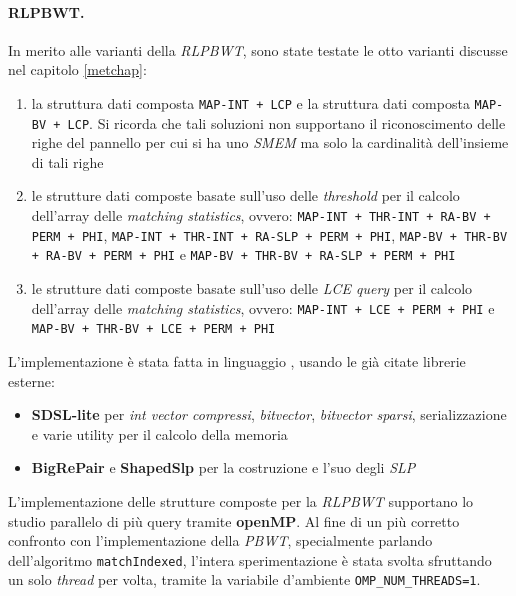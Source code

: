 \paragraph{RLPBWT.}
In merito alle varianti della \textit{RLPBWT}, sono state testate le otto
varianti discusse nel capitolo \ref{metchap}:
\begin{enumerate}
  \item la struttura dati composta \texttt{MAP-INT + LCP} e la struttura dati
  composta \texttt{MAP-BV + LCP}. Si ricorda che tali soluzioni non supportano
  il riconoscimento delle righe del pannello per cui si ha uno \textit{SMEM} ma
  solo la cardinalità dell'insieme di tali righe
  \item le strutture dati composte basate sull'uso delle \textit{threshold} per
  il calcolo dell'array delle \textit{matching statistics}, 
  ovvero: \texttt{MAP-INT + THR-INT + RA-BV + PERM + PHI},  \texttt{MAP-INT +
    THR-INT + RA-SLP + PERM + PHI}, \texttt{MAP-BV + THR-BV + RA-BV + PERM +
    PHI} e \texttt{MAP-BV + THR-BV + RA-SLP + PERM + PHI} 
  \item le strutture dati composte basate sull'uso delle \textit{LCE query}
  per
  il calcolo dell'array delle \textit{matching statistics},
  ovvero: \texttt{MAP-INT + LCE + PERM + PHI} e \texttt{MAP-BV + THR-BV +
    LCE + PERM + PHI} 
\end{enumerate}
L'implementazione è stata fatta in linguaggio \Cplusplus, usando le già citate
librerie esterne:
\begin{itemize}
  \item \textbf{SDSL-lite} per \textit{int vector compressi},
  \textit{bitvector}, \textit{bitvector sparsi}, serializzazione e varie utility
  per il calcolo della memoria
  \item \textbf{BigRePair} e \textbf{ShapedSlp} per la costruzione e l'suo degli
  \textit{SLP} 
\end{itemize}
L'implementazione delle strutture composte per la
\textit{RLPBWT} supportano lo studio parallelo di più query tramite
\textbf{openMP}\cite{openmp}. Al fine di un più 
corretto confronto con l'implementazione della \textit{PBWT}, specialmente
parlando dell'algoritmo \texttt{matchIndexed}, l'intera sperimentazione è stata
svolta sfruttando un solo \textit{thread} per volta, tramite la variabile
d'ambiente \texttt{OMP\_NUM\_THREADS=1}.
